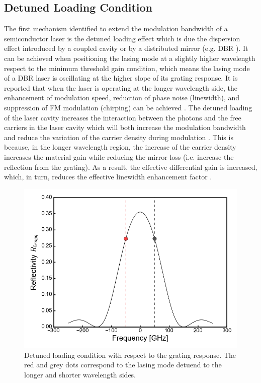 \subsection{Detuned Loading Condition}\label{subsec:detuned_loading}
The first mechanism identified to extend the modulation bandwidth of a semiconductor laser is the detuned loading effect which is due the dispersion effect introduced by a coupled cavity \cite{vahala1984detuned, vahala1985observation} or by a distributed mirror (e.g. DBR \cite{feiste1998optimization, kjebon1997two, chacinski2010impact}). It can be achieved when positioning the lasing mode at a slightly higher wavelength respect to the minimum threshold gain condition, which means the lasing mode of a DBR laser is oscillating at the higher slope of its grating response. It is reported that when the laser is operating at the longer wavelength side, the enhancement of modulation speed, reduction of phase noise (linewidth), and suppression of FM modulation (chirping) can be achieved \cite{vahala1984detuned}. The detuned loading of the laser cavity increases the interaction between the photons and the free carriers in the laser cavity which will both increase the modulation bandwidth and reduce the variation of the carrier density during modulation \cite{kjebon2002experimental}. This is because, in the longer wavelength region, the increase of the carrier density increases the material gain while reducing the mirror loss (i.e. increase the reflection from the grating). As a result, the effective differential gain is increased, which, in turn, reduces the effective linewidth enhancement factor \cite{vahala1984detuned, chacinski2010impact}.

\begin{figure}[ht]
    \centering
    \includegraphics[width=.7\linewidth]{figures/detuned_loading_principle.png}
    \caption{Detuned loading condition with respect to the grating response. The red and grey dots correspond to the lasing mode detuend to the longer and shorter wavelength sides.}
    \label{fig:detuned_loading_principle}
\end{figure}


